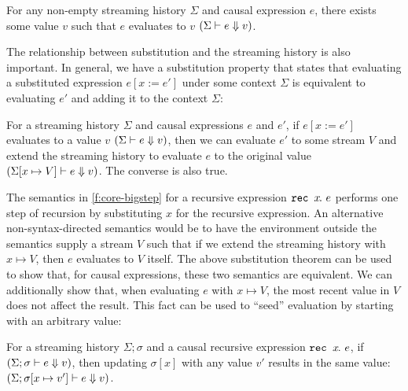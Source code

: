 
\begin{theorem}
  For any non-empty streaming history $\Sigma$ and causal expression $e$, there exists some value $v$ such that $e$ evaluates to $v$ $(\Sigma \vdash e \Downarrow v)$.
\end{theorem}

The relationship between substitution and the streaming history is also important.
In general, we have a substitution property that states that evaluating a substituted expression $e[x := e']$ under some context $\Sigma$ is equivalent to evaluating $e'$ and adding it to the context $\Sigma$:

\begin{theorem}
  For a streaming history $\Sigma$ and causal expressions $e$ and $e'$, if $e[x := e']$ evaluates to a value $v$ $(\Sigma \vdash e \Downarrow v)$, then we can evaluate $e'$ to some stream $V$ and extend the streaming history to evaluate $e$ to the original value $(\Sigma[x \mapsto V] \vdash e \Downarrow v)$.
  The converse is also true.
\end{theorem}


The semantics in \autoref{f:core-bigstep} for a recursive expression $\texttt{rec~} x\hspace{-0.1em}.~e$ performs one step of recursion by substituting $x$ for the recursive expression.
An alternative non-syntax-directed semantics would be to have the environment outside the semantics supply a stream $V$ such that if we extend the streaming history with $x \mapsto V$, then $e$ evaluates to $V$ itself.
The above substitution theorem can be used to show that, for causal expressions, these two semantics are equivalent.
We can additionally show that, when evaluating $e$ with $x \mapsto V$, the most recent value in $V$ does not affect the result.
This fact can be used to ``seed'' evaluation by starting with an arbitrary value:
\begin{theorem}
  For a streaming history $\Sigma; \sigma$ and a causal recursive expression $\texttt{rec~} x\hspace{-0.1em}.~e$, if $(\Sigma; \sigma \vdash e \Downarrow v)$, then updating $\sigma[x]$ with any value $v'$ results in the same value: $(\Sigma; \sigma[x \mapsto v'] \vdash e \Downarrow v)$.
\end{theorem}

